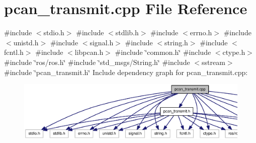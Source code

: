 \section{pcan\-\_\-transmit.\-cpp \-File \-Reference}
\label{pcan__transmit_8cpp}
{\ttfamily \#include $<$stdio.\-h$>$}\*
{\ttfamily \#include $<$stdlib.\-h$>$}\*
{\ttfamily \#include $<$errno.\-h$>$}\*
{\ttfamily \#include $<$unistd.\-h$>$}\*
{\ttfamily \#include $<$signal.\-h$>$}\*
{\ttfamily \#include $<$string.\-h$>$}\*
{\ttfamily \#include $<$fcntl.\-h$>$}\*
{\ttfamily \#include $<$libpcan.\-h$>$}\*
{\ttfamily \#include \char`\"{}common.\-h\char`\"{}}\*
{\ttfamily \#include $<$ctype.\-h$>$}\*
{\ttfamily \#include \char`\"{}ros/ros.\-h\char`\"{}}\*
{\ttfamily \#include \char`\"{}std\-\_\-msgs/\-String.\-h\char`\"{}}\*
{\ttfamily \#include $<$sstream$>$}\*
{\ttfamily \#include \char`\"{}pcan\-\_\-transmit.\-h\char`\"{}}\*
\-Include dependency graph for pcan\-\_\-transmit.\-cpp\-:\nopagebreak
\begin{figure}[H]
\begin{center}
\leavevmode
\includegraphics[width=350pt]{pcan__transmit_8cpp__incl}
\end{center}
\end{figure}
